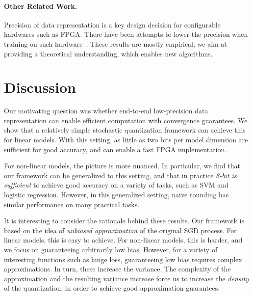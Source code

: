 \documentclass{article}
\begin{document}
\vspace{-1.2em}
\paragraph{Other Related Work.} Precision of data
representation is a key design decision
for configurable hardwares such as FPGA. There have been attempts to
lower the precision when training on such hardware~\cite{Kim:2011:ICASSP}. 
These results are mostly empirical; we
aim at providing a theoretical understanding, which 
enables new algorithms.

\vspace{-1.5em}
\section{Discussion}
\label{sec:conclusions}

\vspace{-1em}
Our motivating question was whether end-to-end low-precision data representation can enable efficient computation with convergence guarantees. 
We show that a relatively simple stochastic quantization framework can achieve this for linear models. 
With this setting, as little as two bits per model dimension are sufficient for good accuracy, and can enable a fast FPGA implementation.  

\vspace{-0.5em}
For non-linear models, the picture is more nuanced. 
In particular, we find that our framework can be generalized to this setting, and that in practice \emph{8-bit is sufficient} to achieve good accuracy on a variety of tasks, such as SVM and logistic regression. 
However, in this generalized setting, naive rounding has similar performance on many practical tasks. 

\vspace{-0.5em}
It is interesting to consider the rationale behind these results. Our framework is based on the idea of \emph{unbiased approximation} of the original SGD process. For linear models, this is easy to achieve. For non-linear models, this is harder, and we focus on guaranteeing arbitrarily low bias. 
However, for a variety of interesting functions such as hinge loss, guaranteeing low bias requires complex approximations. In turn, these increase the variance. The complexity of the approximation and the resulting variance increase force us to increase the \emph{density} of the quantization, in order to achieve good approximation guarantees. 


\cleardoublepage







\end{document}
